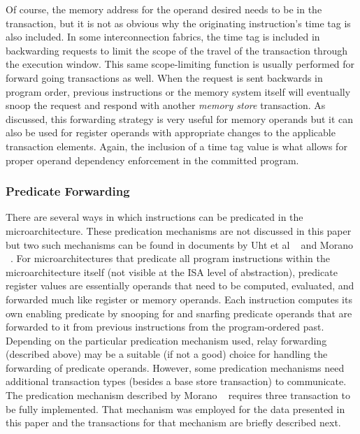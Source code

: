 \documentclass[10pt,twocolumn]{article}
\begin{document}
%
Of course, the memory address for the operand desired
needs to be in the transaction, but it is not as obvious why
the originating instruction's time tag is also included.  In some
interconnection fabrics, the time tag is included in backwarding
requests to limit the scope of the travel of the transaction
through the execution window.  This same scope-limiting function
is usually performed for forward going transactions as well.
When the request is sent backwards in program order, previous
instructions or the memory system itself will eventually snoop
the request and respond with another \textit{memory store}
transaction.
As discussed, this forwarding strategy is very useful for memory
operands but it can also be used for register operands with
appropriate changes to the applicable transaction elements.
Again, the inclusion of a time tag value is what allows
for proper operand dependency enforcement
in the committed program.
%
%
\vspace{-0.25in}
\subsubsection{Predicate Forwarding}
\vspace{-0.15in}
%
There are several ways in which instructions can be predicated
in the microarchitecture.  
These predication mechanisms are not discussed in
this paper but two such mechanisms can be found in
documents by Uht et al ~\cite{Uht01} and Morano ~\cite{Morano02}.
For microarchitectures that predicate all program instructions
within the microarchitecture itself (not visible at the ISA
level of abstraction), predicate register values are essentially
operands that need to be computed, evaluated, and forwarded
much like register or memory operands.
Each instruction computes its own enabling predicate by
snooping for and snarfing predicate operands that are forwarded
to it from previous instructions from the program-ordered past.
Depending on the particular predication mechanism used,
relay forwarding (described above) may be a suitable (if not a good) choice 
for handling the forwarding of predicate operands.
However, some predication mechanisms need additional transaction
types (besides a base store transaction) to communicate.
The predication mechanism described by Morano ~\cite{Morano02}
requires three transaction to be fully implemented.
That mechanism was employed for the data presented in this paper 
and the transactions for that mechanism
are briefly described next.
\end{document}
